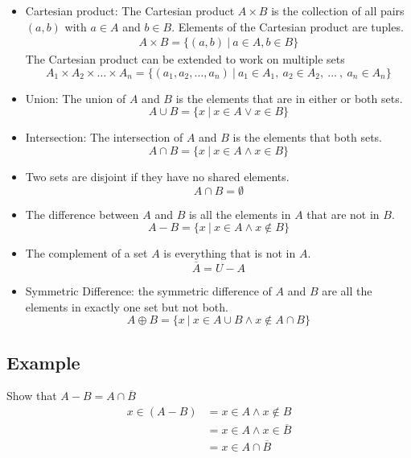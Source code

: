 \documentclass{article}
\theoremstyle{mytheoremstyle}
\theoremstyle{mytheoremstyle}
\theoremstyle{myproblemstyle}
\begin{document}
\begin{itemize}
        \item Cartesian product: The Cartesian product $A \times B$ is the
            collection of all pairs $(a,b)$ with $a\in A$ and $b\in B$. Elements
            of the Cartesian product are tuples.
            \begin{align*}
                A \times B = \{(a,b)\ |\ a\in A, b\in B\}
            \end{align*}
            The Cartesian product can be extended to work on multiple sets
            \[
                A_1\times A_2\times \dots\times A_n = \{(a_1,a_2,\dots,a_n)\
                |\ a_1\in A_1,\ a_2\in A_2,\ \dots\ ,\ a_n\in A_n\}
            \]

        \item Union: The union of $A$ and $B$ is the elements that are in either
            or both sets.
            \[
                A\cup B = \{x\ |\ x\in A \vee x\in B\}
            \]

        \item Intersection: The intersection of $A$ and $B$ is the elements that
            both sets.
            \[
                A\cap B = \{x\ |\ x\in A \wedge x\in B\}
            \]

        \item Two sets are disjoint if they have no shared elements.
            \[
                A \cap B = \emptyset
            \]

        \item The difference between $A$ and $B$ is all the elements in $A$ that
            are not in $B$.
            \[
                A-B = \{x\ |\ x\in A \wedge x\not\in B\}
            \]

        \item The complement of a set $A$ is everything that is not in $A$.
            \[
                \overline{A} = U-A
            \]

        \item Symmetric Difference: the symmetric difference of $A$ and $B$ are
            all the elements in exactly one set but not both.
            \[
                A \oplus B = \{x\ |\ x\in A\cup B \wedge x\not\in A\cap B\}
            \]
    \end{itemize}

    \subsection*{Example}
    Show that $A-B = A\cap \overline{B}$
    \begin{align*}
        x\in (A-B) &= x \in A \wedge x \not\in B \\
        &= x\in A \wedge x\in\overline{B} \\
        &= x\in A\cap\overline{B}
    \end{align*}
\end{document}

